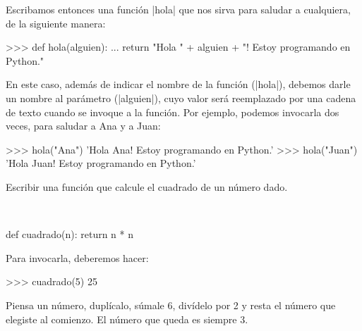 Escribamos entonces una función |hola| que nos sirva para saludar a
cualquiera, de la siguiente manera:

\begin{codigo-python-sn}
>>> def hola(alguien):
...     return "Hola " + alguien + "! Estoy programando en Python."
\end{codigo-python-sn}

En este caso, además de indicar el nombre de la función (|hola|), debemos darle
un nombre al parámetro (|alguien|), cuyo valor será reemplazado por una cadena
de texto cuando se invoque a la función. Por ejemplo, podemos invocarla dos
veces, para saludar a Ana y a Juan:

\begin{codigo-python-sn}
>>> hola("Ana")
'Hola Ana! Estoy programando en Python.'
>>> hola("Juan")
'Hola Juan! Estoy programando en Python.'
\end{codigo-python-sn}

\begin{problema}
\label{cuadrado}
Escribir una función que calcule el cuadrado de un número dado.
\end{problema}

\begin{solucion}
$ $\par
\begin{codigo-python-sn}
def cuadrado(n):
    return n * n
\end{codigo-python-sn}

Para invocarla, deberemos hacer:
\begin{codigo-python-sn}
>>> cuadrado(5)
25
\end{codigo-python-sn}
\end{solucion}

\begin{problema}
Piensa un número, duplícalo, súmale 6, divídelo por 2 y resta el número
que elegiste al comienzo. El número que queda es siempre 3.
\end{problema}

